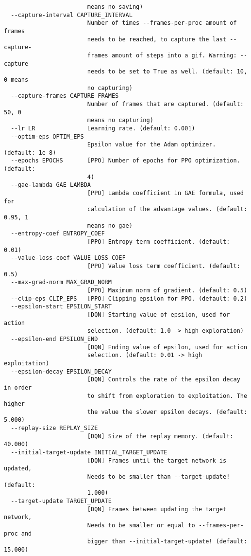 {\begin{verbatim}
                        means no saving)
  --capture-interval CAPTURE_INTERVAL
                        Number of times --frames-per-proc amount of frames
                        needs to be reached, to capture the last --capture-
                        frames amount of steps into a gif. Warning: --capture
                        needs to be set to True as well. (default: 10, 0 means
                        no capturing)
  --capture-frames CAPTURE_FRAMES
                        Number of frames that are captured. (default: 50, 0
                        means no capturing)
  --lr LR               Learning rate. (default: 0.001)
  --optim-eps OPTIM_EPS
                        Epsilon value for the Adam optimizer. (default: 1e-8)
  --epochs EPOCHS       [PPO] Number of epochs for PPO optimization. (default:
                        4)
  --gae-lambda GAE_LAMBDA
                        [PPO] Lambda coefficient in GAE formula, used for
                        calculation of the advantage values. (default: 0.95, 1
                        means no gae)
  --entropy-coef ENTROPY_COEF
                        [PPO] Entropy term coefficient. (default: 0.01)
  --value-loss-coef VALUE_LOSS_COEF
                        [PPO] Value loss term coefficient. (default: 0.5)
  --max-grad-norm MAX_GRAD_NORM
                        [PPO] Maximum norm of gradient. (default: 0.5)
  --clip-eps CLIP_EPS   [PPO] Clipping epsilon for PPO. (default: 0.2)
  --epsilon-start EPSILON_START
                        [DQN] Starting value of epsilon, used for action
                        selection. (default: 1.0 -> high exploration)
  --epsilon-end EPSILON_END
                        [DQN] Ending value of epsilon, used for action
                        selection. (default: 0.01 -> high exploitation)
  --epsilon-decay EPSILON_DECAY
                        [DQN] Controls the rate of the epsilon decay in order
                        to shift from exploration to exploitation. The higher
                        the value the slower epsilon decays. (default: 5.000)
  --replay-size REPLAY_SIZE
                        [DQN] Size of the replay memory. (default: 40.000)
  --initial-target-update INITIAL_TARGET_UPDATE
                        [DQN] Frames until the target network is updated,
                        Needs to be smaller than --target-update! (default:
                        1.000)
  --target-update TARGET_UPDATE
                        [DQN] Frames between updating the target network,
                        Needs to be smaller or equal to --frames-per-proc and
                        bigger than --initial-target-update! (default: 15.000)
    \end{verbatim}
}


